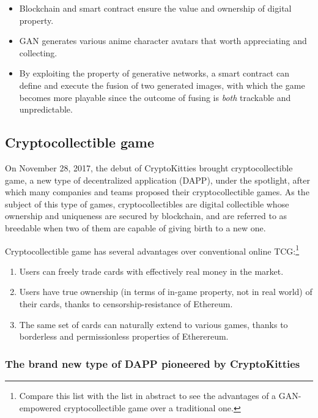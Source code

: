 \documentclass[b5paper]{article}
\begin{document}
\begin{itemize}
\item Blockchain and smart contract ensure the value and ownership of digital property.
\item GAN generates various anime character avatars that worth appreciating and collecting.
\item By exploiting the property of generative networks, a smart contract can define and execute the fusion of two generated images, with which the game becomes more playable since the outcome of fusing is \emph{both} trackable and unpredictable. 
\end{itemize}

\subsection{Cryptocollectible game}

On November 28, 2017, the debut of CryptoKitties\cite{cryptokitties} brought cryptocollectible game, a new type of decentralized application (DAPP), under the spotlight, after which many companies and teams proposed their cryptocollectible games\cite{cryptomons,cryptocountries,cryptopets,cryptoarts,cryptolandmarks,cryptofighters,etheremon,etherwaifu}. As the subject of this type of games, cryptocollectibles are digital collectible whose ownership and uniqueness are secured by blockchain, and are referred to as breedable when two of them are capable of giving birth to a new one.

Cryptocollectible game has several advantages over conventional online TCG:\footnote{Compare this list with the list in abstract to see the advantages of a GAN-empowered cryptocollectible game over a traditional one.}
\begin{enumerate}
\item Users can freely trade cards with effectively real money in the market.
\item Users have true ownership (in terms of in-game property, not in real world) of their cards, thanks to censorship-resistance of Ethereum.
\item The same set of cards can naturally extend to various games, thanks to borderless and permissionless properties of Etherereum.
\end{enumerate}

\subsubsection{The brand new type of DAPP pioneered by CryptoKitties}
\end{document}
